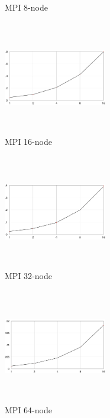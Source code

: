 \documentclass[11pt]{article}
\begin{document}
\begin{figure}[ht]
\begin{subfigure}[h!]{0.3\textwidth}
        \caption{MPI 8-node}
    \end{subfigure}
    \hfill
    \begin{subfigure}[h!]{0.3\textwidth}
        \centering
        \includegraphics[width=4.5cm,height=5cm,keepaspectratio]{m16}
        \caption{MPI 16-node}
    \end{subfigure}
    \hfill
    \begin{subfigure}[h!]{0.3\textwidth}
        \centering
        \includegraphics[width=4.5cm,height=5cm,keepaspectratio]{m32}
        \caption{MPI 32-node}
    \end{subfigure}
    \hfill
    \begin{subfigure}[h!]{0.3\textwidth}
        \centering
        \includegraphics[width=4.5cm,height=5cm,keepaspectratio]{m64}
        \caption{MPI 64-node}
    \end{subfigure}
    \hfill
    \begin{subfigure}[h!]{0.3\textwidth}

\end{subfigure}
\end{figure}
\end{document}
